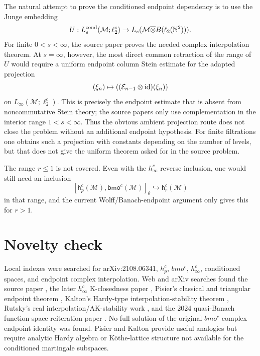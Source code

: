 \documentclass[11pt]{article}
\newcommand{\M}{\mathcal M}
\newcommand{\h}{\mathsf h}
\newcommand{\bmo}{\mathsf{bmo}}
\begin{document}
The natural attempt to prove the conditioned endpoint dependency is to use the
Junge embedding
\[
U:L_s^{\rm cond}(\M;\ell_2^c)\to
L_s(\M\overline\otimes B(\ell_2(\mathbb N^2))).
\]
For finite \(0<s<\infty\), the source paper proves the needed complex
interpolation theorem. At \(s=\infty\), however, the most direct common
retraction of the range of \(U\) would require a uniform endpoint column Stein
estimate for the adapted projection
\[
(\xi_n)\mapsto ((\mathcal E_{n-1}\otimes{\rm id})(\xi_n))
\]
on \(L_\infty(\M;\ell_2^c)\). This is precisely the endpoint estimate that is
absent from noncommutative Stein theory; the source papers only use
complementation in the interior range \(1<s<\infty\). Thus the obvious ambient
projection route does not close the problem without an additional endpoint
hypothesis. For finite filtrations one obtains such a projection with constants
depending on the number of levels, but that does not give the uniform theorem
asked for in the source problem.

The range \(r\leq 1\) is not covered. Even with the \(h_\infty^c\) reverse
inclusion, one would still need an inclusion
\[
[\h_p^c(\M),\bmo^c(\M)]_\theta\hookrightarrow \h_r^c(\M)
\]
in that range, and the current Wolff/Banach-endpoint argument only gives this
for \(r>1\).

\section*{Novelty check}

Local indexes were searched for arXiv:2108.06341, \(h_p^c\), \(bmo^c\),
\(h_\infty^c\), conditioned spaces, and endpoint complex interpolation. Web and
arXiv searches found the source paper \cite{Ran2021}, the later
\(h_\infty^c\) K-closedness paper \cite{Ran2022}, Pisier's classical and
triangular endpoint theorem \cite{Pisier1992}, Kalton's Hardy-type
interpolation-stability theorem \cite{Kalton1994}, Rutsky's real
interpolation/AK-stability work \cite{Rutsky2018}, and the 2024
quasi-Banach function-space reiteration paper \cite{EK2024}. No full solution
of the original \(bmo^c\) complex endpoint identity was found. Pisier and
Kalton provide useful analogies but require analytic Hardy algebra or
K\"othe-lattice structure not available for the conditioned martingale
subspaces.
\end{document}
